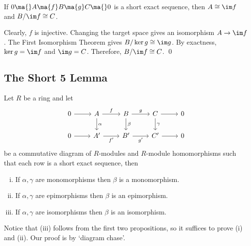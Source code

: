 \begin{prop}
If $0 \ma{} A \ma{f} B \ma{g} C \ma{} 0$ is a short exact sequence, then $A \cong \im f$ and $B/\im f \cong C$.
\end{prop}

\pf Clearly, $f$ is injective. Changing the target space gives an isomorphism $A \to \im f$. The First Isomorphism Theorem gives $B/ \ker g \cong \im g$. By exactness, $\ker g = \im f$ and $\im g=C$. Therefore, $B/\im f \cong C$. \qed \\



\subsection{The Short 5 Lemma}



\begin{lem} \label{lem:shortfive}
Let $R$ be a ring and let
	\[
	\begin{tikzcd}
	0 \arrow{r} & A \arrow{r}{f} \arrow{d}{\alpha} & B \arrow{r}{g} \arrow{d}{\beta} & C \arrow{r} \arrow{d}{\gamma} & 0 \\
	0 \arrow{r} & A' \arrow[swap]{r}{f'} & B' \arrow[swap]{r}{g'} & C' \arrow{r} & 0
	\end{tikzcd}
	\]
be a commutative diagram of $R$-modules and $R$-module homomorphisms such that each row is a short exact sequence, then 
	\begin{enumerate}[(i)]
	\item If $\alpha,\gamma$ are monomorphisms then $\beta$ is a monomorphism.
	\item If $\alpha,\gamma$ are epimorphisms then $\beta$ is an epimorphism. 
	\item If $\alpha,\gamma$ are isomorphisms then $\beta$ is an isomorphism. 
	\end{enumerate}
\end{lem}

\pf Notice that (iii) follows from the first two propositions, so it suffices to prove (i) and (ii). Our proof is by `diagram chase'.

